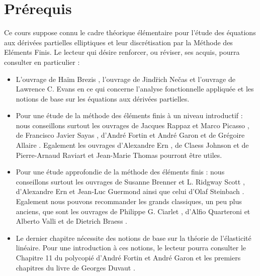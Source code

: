 \documentclass[11pt]{book}
\begin{document}
\section{Prérequis}

Ce cours suppose connu le cadre théorique élémentaire pour l'étude des équations aux dérivées partielles elliptiques et leur discrétisation par la Méthode des Eléments Finis.
Le lecteur qui désire renforcer, ou réviser, ses acquis, pourra consulter en particulier :
\begin{itemize}

\item L'ouvrage de Haïm Brezis \cite{brezis-83}, l'ouvrage de Jind\"rich Ne\v{c}as \cite{necas-67} et l'ouvrage de Lawrence C. Evans \cite{evans-2010} en ce qui concerne l'analyse fonctionnelle appliquée et les notions de base sur les équations aux dérivées partielles.

\item Pour une étude de la méthode des éléments finis à un niveau introductif : nous conseillons surtout les ouvrages de Jacques Rappaz et Marco Picasso \cite{rappaz-picasso-98}, de Francisco Javier Sayas \cite{sayas2008}, d'André Fortin et André Garon \cite{fortin-2011} et de Grégoire Allaire \cite{allaire-2007}. Egalement les ouvrages d'Alexandre Ern \cite{ern-2005}, de Claess Johnson \cite{johnson-1987} et de Pierre-Arnaud Raviart et Jean-Marie Thomas \cite{raviart-thomas-83} pourront être utiles.

\item Pour une étude approfondie de la méthode des éléments finis : nous conseillons surtout les ouvrages de Susanne Brenner et L. Ridgway Scott \cite{brenner-scott-07}, d'Alexandre Ern et Jean-Luc Guermond \cite{ern-guermond-04} ainsi que celui d'Olaf Steinbach \cite{steinbach-2008}. Egalement nous pouvons recommander les grands classiques, un peu plus anciens, que sont les ouvrages de Philippe G. Ciarlet \cite{ciarlet-78}, d'Alfio Quarteroni et Alberto Valli \cite{quarteroni-valli-94} et de Dietrich Braess \cite{braess-2007}.

\item Le dernier chapitre nécessite des notions de base sur la théorie de l'élasticité linéaire. Pour une introduction à ces notions, le lecteur pourra consulter le Chapitre 11 du polycopié d'André Fortin et André Garon \cite{fortin-2011} et les premiers chapitres du livre de Georges Duvaut \cite{duvaut-98}.

\end{itemize}
\end{document}
